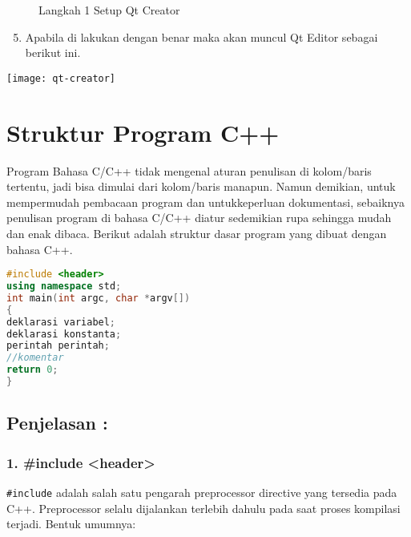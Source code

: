 \begin{figure}[htbp]
\centering
{}
\caption{Langkah 1 Setup Qt Creator }
\end{figure}

\begin{enumerate}

\setcounter{enumi}{4}

\item
  Apabila di lakukan dengan benar maka akan muncul Qt Editor sebagai
  berikut ini.
\end{enumerate}

\begin{center}

\texttt{[image: qt-creator]}

\end{center}

\section{Struktur Program C++}\label{struktur-program-cpp}

Program Bahasa C/C++ tidak mengenal aturan penulisan di kolom/baris
tertentu, jadi bisa dimulai dari kolom/baris manapun. Namun demikian,
untuk mempermudah pembacaan program dan untukkeperluan dokumentasi,
sebaiknya penulisan program di bahasa C/C++ diatur sedemikian rupa
sehingga mudah dan enak dibaca. Berikut adalah struktur dasar program
yang dibuat dengan bahasa C++.

\begin{lstlisting}[language=c++, caption=Struktur Program C++]
#include <header>  
using namespace std;    
int main(int argc, char *argv[])
{  
deklarasi variabel;   
deklarasi konstanta;  
perintah perintah;  
//komentar  
return 0;  
}  
\end{lstlisting}

\subsection*{Penjelasan :}

\subsubsection*{ 1. \#include <header>}

\texttt{\#include} adalah salah satu pengarah preprocessor directive
yang tersedia pada C++. Preprocessor selalu dijalankan terlebih dahulu
pada saat proses kompilasi terjadi. Bentuk umumnya:


